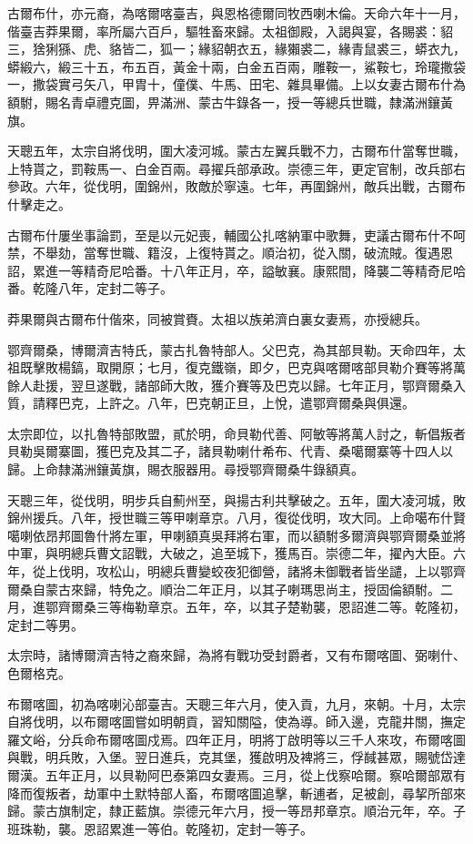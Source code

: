 \begin{pinyinscope}
古爾布什，亦元裔，為喀爾喀臺吉，與恩格德爾同牧西喇木倫。天命六年十一月，偕臺吉莽果爾，率所屬六百戶，驅牲畜來歸。太祖御殿，入謁與宴，各賜裘：貂三，猞猁猻、虎、貉皆二，狐一；緣貂朝衣五，緣獺裘二，緣青鼠裘三，蟒衣九，蟒緞六，緞三十五，布五百，黃金十兩，白金五百兩，雕鞍一，鯊鞍七，玲瓏撒袋一，撒袋實弓矢八，甲胄十，僮僕、牛馬、田宅、雜具畢備。上以女妻古爾布什為額駙，賜名青卓禮克圖，畀滿洲、蒙古牛錄各一，授一等總兵世職，隸滿洲鑲黃旗。

天聰五年，太宗自將伐明，圍大凌河城。蒙古左翼兵戰不力，古爾布什當奪世職，上特貰之，罰鞍馬一、白金百兩。尋擢兵部承政。崇德三年，更定官制，改兵部右參政。六年，從伐明，圍錦州，敗敵於寧遠。七年，再圍錦州，敵兵出戰，古爾布什擊走之。

古爾布什屢坐事論罰，至是以元妃喪，輔國公扎喀納軍中歌舞，吏議古爾布什不呵禁，不舉劾，當奪世職、籍沒，上復特貰之。順治初，從入關，破流賊。復遇恩詔，累進一等精奇尼哈番。十八年正月，卒，謚敏襄。康熙間，降襲二等精奇尼哈番。乾隆八年，定封二等子。

莽果爾與古爾布什偕來，同被賞賚。太祖以族弟濟白裏女妻焉，亦授總兵。

鄂齊爾桑，博爾濟吉特氏，蒙古扎魯特部人。父巴克，為其部貝勒。天命四年，太祖既擊敗楊鎬，取開原；七月，復克鐵嶺，即夕，巴克與喀爾喀部貝勒介賽等將萬餘人赴援，翌旦遂戰，諸部師大敗，獲介賽等及巴克以歸。七年正月，鄂齊爾桑入質，請釋巴克，上許之。八年，巴克朝正旦，上悅，遣鄂齊爾桑與俱還。

太宗即位，以扎魯特部敗盟，貳於明，命貝勒代善、阿敏等將萬人討之，斬倡叛者貝勒吳爾寨圖，獲巴克及其二子，諸貝勒喇什希布、代青、桑噶爾寨等十四人以歸。上命隸滿洲鑲黃旗，賜衣服器用。尋授鄂齊爾桑牛錄額真。

天聰三年，從伐明，明步兵自薊州至，與揚古利共擊破之。五年，圍大凌河城，敗錦州援兵。八年，授世職三等甲喇章京。八月，復從伐明，攻大同。上命噶布什賢噶喇依昂邦圖魯什將左軍，甲喇額真吳拜將右軍，而以額駙多爾濟與鄂齊爾桑並將中軍，與明總兵曹文詔戰，大破之，追至城下，獲馬百。崇德二年，擢內大臣。六年，從上伐明，攻松山，明總兵曹變蛟夜犯御營，諸將未御戰者皆坐譴，上以鄂齊爾桑自蒙古來歸，特免之。順治二年正月，以其子喇瑪思尚主，授固倫額駙。二月，進鄂齊爾桑三等梅勒章京。五年，卒，以其子楚勒襲，恩詔進二等。乾隆初，定封二等男。

太宗時，諸博爾濟吉特之裔來歸，為將有戰功受封爵者，又有布爾喀圖、弼喇什、色爾格克。

布爾喀圖，初為喀喇沁部臺吉。天聰三年六月，使入貢，九月，來朝。十月，太宗自將伐明，以布爾喀圖嘗如明朝貢，習知關隘，使為導。師入邊，克龍井關，撫定羅文峪，分兵命布爾喀圖戍焉。四年正月，明將丁啟明等以三千人來攻，布爾喀圖與戰，明兵敗，入堡。翌日進兵，克其堡，獲啟明及裨將三，俘馘甚眾，賜號岱達爾漢。五年正月，以貝勒阿巴泰第四女妻焉。三月，從上伐察哈爾。察哈爾部眾有降而復叛者，劫軍中土默特部人畜，布爾喀圖追擊，斬逋者，足被創，尋挈所部來歸。蒙古旗制定，隸正藍旗。崇德元年六月，授一等昂邦章京。順治元年，卒。子班珠勒，襲。恩詔累進一等伯。乾隆初，定封一等子。


\end{pinyinscope}
